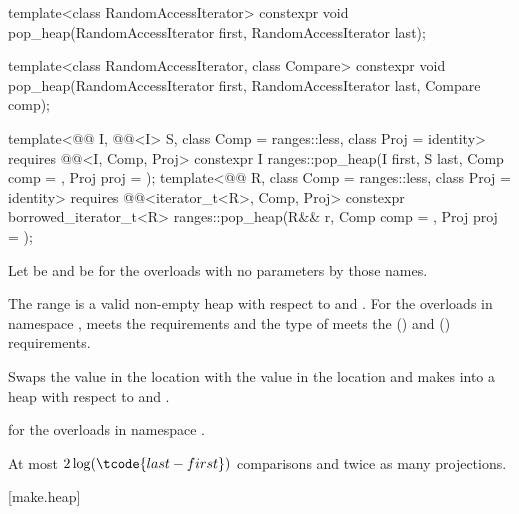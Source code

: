 %
\begin{itemdecl}
template<class RandomAccessIterator>
  constexpr void pop_heap(RandomAccessIterator first, RandomAccessIterator last);

template<class RandomAccessIterator, class Compare>
  constexpr void pop_heap(RandomAccessIterator first, RandomAccessIterator last,
                          Compare comp);

template<@@ I, @@<I> S, class Comp = ranges::less,
         class Proj = identity>
  requires @@<I, Comp, Proj>
  constexpr I
    ranges::pop_heap(I first, S last, Comp comp = {}, Proj proj = {});
template<@@ R, class Comp = ranges::less, class Proj = identity>
  requires @@<iterator_t<R>, Comp, Proj>
  constexpr borrowed_iterator_t<R>
    ranges::pop_heap(R&& r, Comp comp = {}, Proj proj = {});
\end{itemdecl}

\begin{itemdescr}
\pnum
Let  be 
and  be 
for the overloads with no parameters by those names.

\pnum
\expects
The range 
is a valid non-empty heap with respect to  and .
For the overloads in namespace ,
 meets
the  requirements and
the type of  meets
the  () and
 () requirements.

\pnum
\effects
Swaps the value in the location 
with the value in the location
and makes
into a heap with respect to  and .

\pnum
\returns
{} for the overloads in namespace .

\pnum
\complexity
At most $2 \log(\tcode{last - first})$ comparisons and
twice as many projections.
\end{itemdescr}

[make.heap]{}

